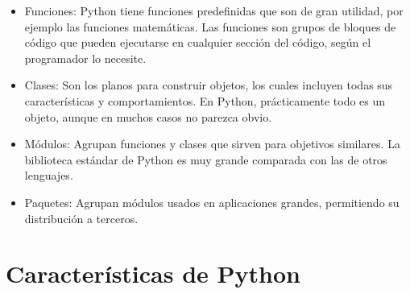 \documentclass{report}
\begin{document}
\begin{itemize}
  \item Funciones: Python tiene funciones predefinidas que son de gran utilidad, por ejemplo las funciones matemáticas. Las funciones son grupos de bloques de código que pueden ejecutarse en cualquier sección del código, según el programador lo necesite.
  
  \item Clases: Son los planos para construir objetos, los cuales incluyen todas sus características y comportamientos. En Python, prácticamente todo es un objeto, aunque en muchos casos no parezca obvio.
  
  \item Módulos: Agrupan funciones y clases que sirven para objetivos similares. La biblioteca estándar de Python es muy grande comparada con las de otros lenguajes.
  
  \item Paquetes: Agrupan módulos usados en aplicaciones grandes, permitiendo su distribución a terceros.

\end{itemize}

\section{Características de Python}
\end{document}
